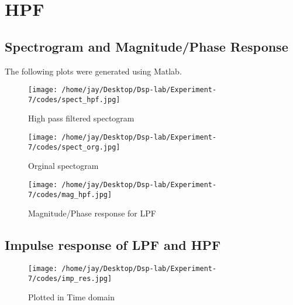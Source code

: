 \documentclass[journal,12pt,onecolumn]{IEEEtran}
\theoremstyle{remark}
\begin{document}
\clearpage

\section{HPF}
\subsection{Spectrogram and Magnitude/Phase Response}
The following plots were generated using Matlab.
\begin{figure}[ht] %
  \centering
  \begin{minipage}[t]{0.45\textwidth}
    \texttt{[image: /home/jay/Desktop/Dsp-lab/Experiment-7/codes/spect\_hpf.jpg]}
    \caption{High pass filtered spectogram}
  \end{minipage}\hfill
  \begin{minipage}[t]{0.45\textwidth}
    \texttt{[image: /home/jay/Desktop/Dsp-lab/Experiment-7/codes/spect\_org.jpg]}
    \caption{Orginal spectogram}
  \end{minipage}
\end{figure}\begin{figure}[ht] %
  \centering
  \texttt{[image: /home/jay/Desktop/Dsp-lab/Experiment-7/codes/mag\_hpf.jpg]}
  \caption{Magnitude/Phase response for LPF}
\end{figure}
\clearpage
\subsection{Impulse response of LPF and HPF}
\begin{figure}[ht] %
  \centering
  \texttt{[image: /home/jay/Desktop/Dsp-lab/Experiment-7/codes/imp\_res.jpg]}
  \caption{Plotted in Time domain}
\end{figure}
\end{document}

